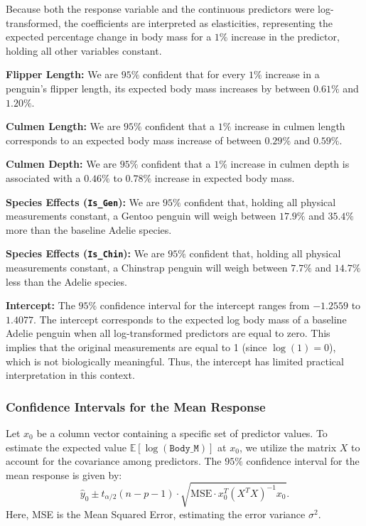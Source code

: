 \documentclass[12pt]{article}
\begin{document}
Because both the response variable and the continuous predictors were
log-transformed, the coefficients are interpreted as
elasticities, representing the expected percentage change in
body mass for a $1\%$ increase in the predictor,
holding all other variables constant.
\begin{itemize}
    \ii \textbf{Flipper Length:} We are $95\%$ confident that for every $1\%$
    increase in a penguin's flipper length,
    its expected body mass increases by between $0.61\%$ and $1.20\%$.

    \ii \textbf{Culmen Length:} We are $95\%$ confident that a $1\%$
    increase in culmen length corresponds to an expected body mass
    increase of between $0.29\%$ and $0.59\%$.

    \ii \textbf{Culmen Depth:} We are $95\%$ confident that a $1\%$
    increase in culmen depth is associated with a
    $0.46\%$ to $0.78\%$ increase in expected body mass.

    \ii \textbf{Species Effects (\texttt{Is\_Gen}):}
    We are $95\%$ confident that,
    holding all physical measurements constant,
    a Gentoo penguin will weigh between $17.9\%$ and $35.4\%$
    more than the baseline Adelie species.

    \ii \textbf{Species Effects (\texttt{Is\_Chin}):}
    We are $95\%$ confident that,
    holding all physical measurements constant,
    a Chinstrap penguin will weigh between $7.7\%$ and $14.7\%$
    less than the Adelie species.

    \ii \textbf{Intercept:} The $95\%$ confidence interval
    for the intercept ranges from $-1.2559$ to $1.4077$.
    The intercept corresponds to the expected
    log body mass of a baseline Adelie penguin
    when all log-transformed predictors are equal to zero.
    This implies that the original
    measurements are equal to 1 (since $\log(1) = 0$),
    which is not biologically meaningful.
    Thus, the intercept has limited practical
    interpretation in this context.
\end{itemize}

\subsubsection{Confidence Intervals for the Mean Response}
Let $x_0$ be
a column vector containing a specific set of predictor
values. To estimate the expected value $\mathbb{E}[\log(\texttt{Body\_M})]$ at
$x_0$, we utilize the matrix $X$
to account for the covariance among predictors. The $95\%$
confidence interval for the mean response is given by:
\[
  \hat{y}_0 \pm t_{\alpha/2}(n-p-1) \cdot
  \sqrt{\text{MSE} \cdot x_0^T
  (X^T X)^{-1} x_0}
.\]
Here, MSE is the Mean Squared Error, estimating the error
variance $\sigma^2$.
\end{document}
